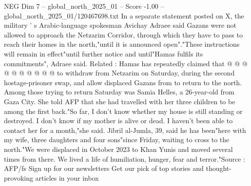 \begin{textsample}{NEG Dim 7 – global\_north\_2025\_01 – Score -1.00 – global\_north\_2025\_01/120467698.txt}
In a separate statement posted on X, the military ' s Arabic-language spokesman Avichay Adraee said Gazans were not allowed to approach the Netzarim Corridor, through which they have to pass to reach their homes in the north,"until it is announced open"."These instructions will remain in effect"until further notice and until"Hamas fulfils its commitments", Adraee said.
Related : Hamas has repeatedly claimed that @ @ @ @ @ @ @ @ @ @ to withdraw from Netzarim on Saturday, during the second hostage-prisoner swap, and allow displaced Gazans from to return to the north.
Among those trying to return Saturday was Samia Helles, a 26-year-old from Gaza City.
She told AFP that she had travelled with her three children to be among the first back."So far, I don't know whether my house is still standing or destroyed.
I don't know if my mother is alive or dead.
I haven't been able to contact her for a month,"she said.
Jibril al-Jumla, 39, said he has been"here with my wife, three daughters and four sons"since Friday, waiting to cross to the north."We were displaced in October 2023 to Khan Yunis and moved several times from there.
We lived a life of humiliation, hunger, fear and terror."Source : AFP/fs Sign up for our newsletters Get our pick of top stories and thought-provoking articles in your inbox

\end{textsample}
